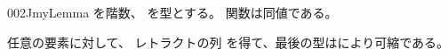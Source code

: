 \documentclass[index]{subfiles}
\begin{document}
\begin{myBlock}{002J}{myLemma}
  を階数、
  を型とする。
  関数は同値である。
\end{myBlock}
\StartDefiningTabulars
\begin{myProof}
  任意の要素に対して、
  レトラクトの列
  を得て、最後の型はにより可縮である。
\end{myProof}
\StopDefiningTabulars
\end{document}
